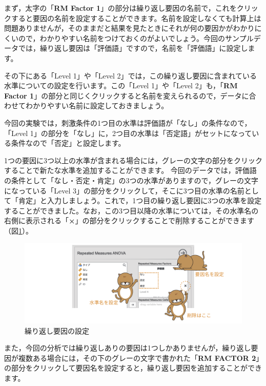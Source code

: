 \documentclass[
  12pt,
  a5jpaper,
  lualatex, ja=standard]{bxjsbook}
\begin{document}
まず，太字の「\textbf{RM Factor 1}」の部分は繰り返し要因の名前で，これをクリックすると要因の名前を設定することができます。名前を設定しなくても計算上は問題ありませんが，そのままだと結果を見たときにそれが何の要因かがわかりにくいので，わかりやすい名前をつけておくのがよいでしょう。今回のサンプルデータでは，繰り返し要因は「評価語」ですので，名前を「評価語」に設定します。

その下にある「Level 1」や「Level 2」では，この繰り返し要因に含まれている水準についての設定を行います。この「Level 1」や「Level 2」も，「\textbf{RM Factor 1}」の部分と同じくクリックすると名前を変えられるので，データに合わせてわかりやすい名前に設定しておきましょう。

今回の実験では，刺激条件の1つ目の水準は評価語が「なし」の条件なので，「Level 1」の部分を「なし」に，2つ目の水準は「否定語」がセットになっている条件なので「否定」と設定します。

1つの要因に3つ以上の水準が含まれる場合には，グレーの文字の部分をクリックすることで新たな水準を追加することができます。
今回のデータでは，評価語の条件として「なし・否定・肯定」の3つの水準がありますので，グレーの文字になっている「Level 3」の部分をクリックして，そこに3つ目の水準の名前として「肯定」と入力しましょう。これで，1つ目の繰り返し要因に3つの水準を設定することができました。なお，この3つ目以降の水準については，その水準名の右側に表示される「\textbf{×}」の部分をクリックすることで削除することができます（図\ref{fig:ANOVA-rm-rmfactor2}）。

\begin{figure}[!ht]

{\centering \includegraphics[width=1\linewidth]{images/ANOVA/rm-rmfactor2} 

}

\caption{繰り返し要因の設定}\label{fig:ANOVA-rm-rmfactor2}
\end{figure}

また，今回の分析では繰り返しありの要因は1つしかありませんが，繰り返し要因が複数ある場合には，その下のグレーの文字で書かれた「\textbf{RM FACTOR 2}」の部分をクリックして要因名を設定すると，繰り返し要因を追加することができます。
\end{document}
